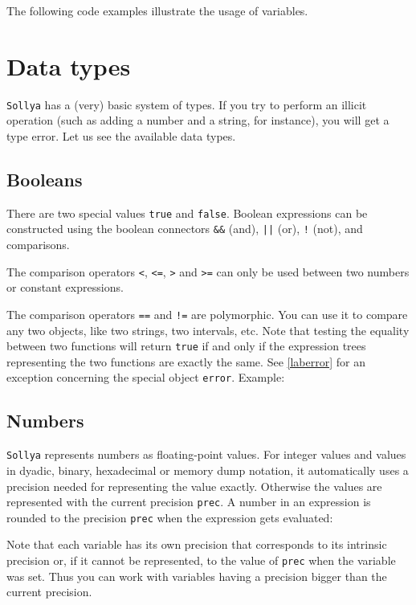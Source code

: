 \documentclass[a4paper]{article}
\newcommand{\com}[1]{\texttt{#1}}
\newcommand{\key}[1]{\texttt{#1}}
\newcommand{\sollya}{\texttt{Sollya}\xspace}
\begin{document}
The following code examples illustrate the usage of variables.




\section{Data types}
\sollya has a (very) basic system of types. If you try to perform an illicit operation (such as adding a number and a string, for instance), you will get a type error. Let us see the available data types.

\subsection{Booleans}
There are two special values \key{true} and \key{false}. Boolean expressions can be constructed using the boolean connectors \key{\&\&} (and), \key{||} (or), \key{!} (not), and comparisons.

The comparison operators \key{<}, \key{<=}, \key{>} and \key{>=} can only be used between two numbers or constant expressions.

The comparison operators \key{==} and \key{!=} are polymorphic. You can use it to compare any two objects, like two strings, two intervals, etc. Note that testing the equality between two functions will return \key{true} if and only if the expression trees representing the two functions are exactly the same. See \ref{laberror} for an exception concerning the special object \key{error}. Example:



\subsection{Numbers}
\sollya represents numbers as floating-point values. For integer values and values in dyadic, binary, hexadecimal or memory dump notation, it 
automatically uses a precision needed for representing the value exactly. Otherwise the values are represented with the current precision \com{prec}. A number in an expression is rounded to the precision \com{prec} when the expression gets evaluated:



Note that each variable has its own precision that corresponds to its intrinsic precision or, if it cannot be represented, to the value of \com{prec} when the variable was set. Thus you can work with variables having a precision bigger than the current precision.
\end{document}
